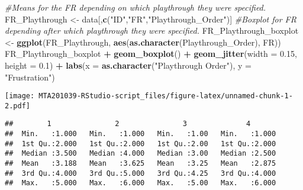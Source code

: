 \documentclass[
]{article}
\newenvironment{Shaded}{\begin{snugshade}}{\end{snugshade}}
\newcommand{\CommentTok}[1]{\textcolor[rgb]{0.56,0.35,0.01}{\textit{#1}}}
\newcommand{\DataTypeTok}[1]{\textcolor[rgb]{0.13,0.29,0.53}{#1}}
\newcommand{\FloatTok}[1]{\textcolor[rgb]{0.00,0.00,0.81}{#1}}
\newcommand{\KeywordTok}[1]{\textcolor[rgb]{0.13,0.29,0.53}{\textbf{#1}}}
\newcommand{\NormalTok}[1]{#1}
\newcommand{\OperatorTok}[1]{\textcolor[rgb]{0.81,0.36,0.00}{\textbf{#1}}}
\newcommand{\OtherTok}[1]{\textcolor[rgb]{0.56,0.35,0.01}{#1}}
\newcommand{\StringTok}[1]{\textcolor[rgb]{0.31,0.60,0.02}{#1}}
\begin{document}
\begin{Shaded}
\begin{Highlighting}[]
\CommentTok{#Means for the FR depending on which playthrough they were specified.}
\NormalTok{FR_Playthrough <-}\StringTok{ }\NormalTok{data[,}\KeywordTok{c}\NormalTok{(}\StringTok{"ID"}\NormalTok{,}\StringTok{"FR"}\NormalTok{,}\StringTok{"Playthrough_Order"}\NormalTok{)]}
\CommentTok{#Boxplot for FR depending after which playthrough they were specified.}
\NormalTok{FR_Playthrough_boxplot <-}\StringTok{ }\KeywordTok{ggplot}\NormalTok{(FR_Playthrough, }\KeywordTok{aes}\NormalTok{(}\KeywordTok{as.character}\NormalTok{(Playthrough_Order), FR))}
\NormalTok{FR_Playthrough_boxplot }\OperatorTok{+}\StringTok{ }\KeywordTok{geom_boxplot}\NormalTok{() }\OperatorTok{+}\StringTok{ }\KeywordTok{geom_jitter}\NormalTok{(}\DataTypeTok{width =} \FloatTok{0.15}\NormalTok{, }\DataTypeTok{height =} \FloatTok{0.1}\NormalTok{) }\OperatorTok{+}\StringTok{ }\KeywordTok{labs}\NormalTok{(}\DataTypeTok{x =} \KeywordTok{as.character}\NormalTok{(}\StringTok{"Playthrough Order"}\NormalTok{), }\DataTypeTok{y =} \StringTok{"Frustration"}\NormalTok{)}
\end{Highlighting}
\end{Shaded}

\texttt{[image: MTA201039-RStudio-script\_files/figure-latex/unnamed-chunk-1-2.pdf]}

\begin{Shaded}
\end{Shaded}

\begin{verbatim}
##        1               2               3              4        
##  Min.   :1.000   Min.   :1.000   Min.   :1.00   Min.   :1.000  
##  1st Qu.:2.000   1st Qu.:2.000   1st Qu.:2.00   1st Qu.:2.000  
##  Median :3.500   Median :4.000   Median :3.00   Median :2.500  
##  Mean   :3.188   Mean   :3.625   Mean   :3.25   Mean   :2.875  
##  3rd Qu.:4.000   3rd Qu.:5.000   3rd Qu.:4.25   3rd Qu.:4.000  
##  Max.   :5.000   Max.   :6.000   Max.   :5.00   Max.   :6.000
\end{verbatim}
\end{document}
